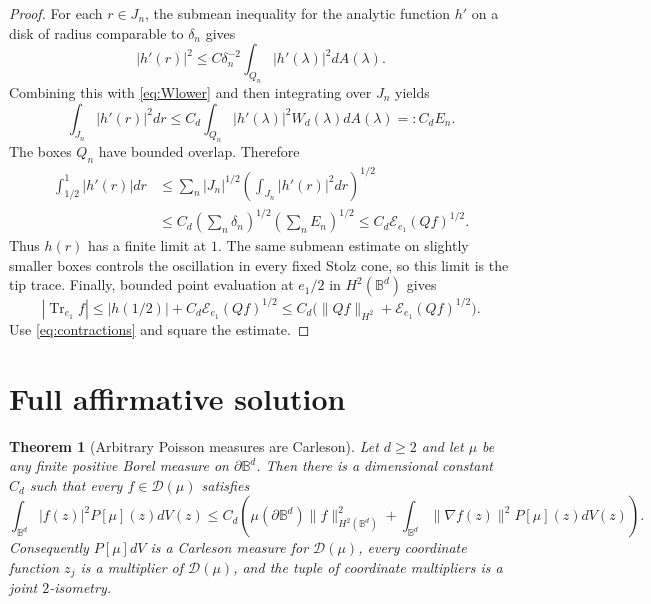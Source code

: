 \documentclass[11pt]{article}
\newtheorem{theorem}{Theorem}
\theoremstyle{remark}
\newcommand{\Bd}{\mathbb B^d}
\newcommand{\Sd}{\partial\mathbb B^d}
\newcommand{\Tr}{\operatorname{Tr}}
\begin{document}
\begin{proof}
For each $r\in J_n$, the submean inequality for the analytic function $h'$
on a disk of radius comparable to $\delta_n$ gives
\[
 |h'(r)|^2\leq C\delta_n^{-2}
 \int_{Q_n}|h'(\lambda)|^2dA(\lambda).
\]
Combining this with \eqref{eq:Wlower} and then integrating over $J_n$ yields
\begin{equation}\label{eq:lineenergy}
 \int_{J_n}|h'(r)|^2dr
 \leq C_d\int_{Q_n}|h'(\lambda)|^2W_d(\lambda)dA(\lambda)
 =:C_d E_n.
\end{equation}
The boxes $Q_n$ have bounded overlap.  Therefore
\begin{align*}
 \int_{1/2}^1|h'(r)|dr
 &\leq\sum_n |J_n|^{1/2}
 \left(\int_{J_n}|h'(r)|^2dr\right)^{1/2}\\
 &\leq C_d\left(\sum_n\delta_n\right)^{1/2}
 \left(\sum_n E_n\right)^{1/2}
 \leq C_d\mathcal E_{e_1}(Qf)^{1/2}.
\end{align*}
Thus $h(r)$ has a finite limit at $1$.  The same submean estimate on slightly
smaller boxes controls the oscillation in every fixed Stolz cone, so this
limit is the tip trace.  Finally, bounded point evaluation at $e_1/2$ in
$H^2(\Bd)$ gives
\[
 |\Tr_{e_1}f|
 \leq |h(1/2)|+C_d\mathcal E_{e_1}(Qf)^{1/2}
 \leq C_d\bigl(\lVert Qf\rVert_{H^2}+\mathcal E_{e_1}(Qf)^{1/2}\bigr).
\]
Use \eqref{eq:contractions} and square the estimate.
\end{proof}

\section{Full affirmative solution}

\begin{theorem}[Arbitrary Poisson measures are Carleson]\label{thm:main}
Let $d\geq2$ and let $\mu$ be any finite positive Borel measure on $\Sd$.
Then there is a dimensional constant $C_d$ such that every
$f\in\mathscr D(\mu)$ satisfies
\begin{equation}\label{eq:mainestimate}
 \int_{\Bd}|f(z)|^2P[\mu](z)dV(z)
 \leq C_d\left(
 \mu(\Sd)\lVert f\rVert_{H^2(\Bd)}^2
 +\int_{\Bd}\lVert\nabla f(z)\rVert^2P[\mu](z)dV(z)
 \right).
\end{equation}
Consequently $P[\mu]dV$ is a Carleson measure for $\mathscr D(\mu)$, every
coordinate function $z_j$ is a multiplier of $\mathscr D(\mu)$, and the
tuple of coordinate multipliers is a joint $2$-isometry.
\end{theorem}
\end{document}
